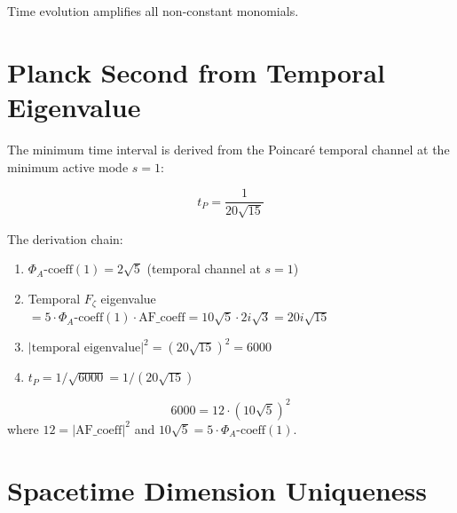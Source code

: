 \begin{theorem}
\label{thm:mat_phi_pow_gt}
\leanok
Time evolution amplifies all non-constant monomials.
\end{theorem}

\section{Planck Second from Temporal Eigenvalue}
\label{sec:mat_planck_second}

The minimum time interval is derived from the Poincar\'{e} temporal channel at the minimum active mode $s = 1$:

\begin{definition}
\label{def:mat_planck_second}
\leanok
\[
t_P = \frac{1}{20\sqrt{15}}
\]
\end{definition}

\begin{theorem}[$t_P > 0$]
\label{thm:mat_planck_pos}
\leanok
\end{theorem}

\begin{theorem}[$t_P^2 = 1/6000$]
\label{thm:mat_planck_sq}
\leanok
\end{theorem}

The derivation chain:
\begin{enumerate}
\item $\Phi_A\text{-coeff}(1) = 2\sqrt{5}$ (temporal channel at $s = 1$)
\item Temporal $F_\zeta$ eigenvalue $= 5 \cdot \Phi_A\text{-coeff}(1) \cdot \mathrm{AF\_coeff} = 10\sqrt{5} \cdot 2i\sqrt{3} = 20i\sqrt{15}$
\item $|\text{temporal eigenvalue}|^2 = (20\sqrt{15})^2 = 6000$
\item $t_P = 1/\sqrt{6000} = 1/(20\sqrt{15})$
\end{enumerate}

\begin{theorem}
\label{thm:mat_temporal_decomposition}
\leanok
\[
6000 = 12 \cdot (10\sqrt{5})^2
\]
where $12 = |\mathrm{AF\_coeff}|^2$ and $10\sqrt{5} = 5 \cdot \Phi_A\text{-coeff}(1)$.
\end{theorem}

\section{Spacetime Dimension Uniqueness}
\label{sec:mat_spacetime_dim}

